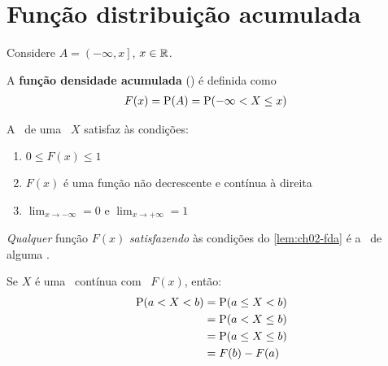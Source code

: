 \section[Distribuição acumulada]{Função distribuição acumulada}

Considere $A = \left(-\infty, x\right]$, $x \in \operatorname{\mathbb{R}}$.
\begin{definition}\label{def:ch02-fda}
    A \textbf{função densidade acumulada} (\fda) é definida como
    \begin{align}
        F(x) &= \operatorname{P}(A) = \operatorname{P}(-\infty < X \leq x)\label{eq:ch02-fda}
    \end{align}
\end{definition}

\begin{lemma}\label{lem:ch02-fda}
    A \fda\ de uma \va\ $X$ satisfaz às condições:
    \begin{enumerate}
        \item\label{it:ch02-fda-prop-amplitude}
            $0 \leq F(x) \leq 1$
        \item\label{it:ch02-fda-prop-cresc-cd}
            $F(x)$ é uma função não decrescente e contínua à direita
        \item\label{it:ch02-fda-prop-limites}
            $\lim_{x\to -\infty} = 0$ e $\lim_{x\to +\infty} = 1$
    \end{enumerate}
\end{lemma}

\textit{Qualquer} função $F(x)$ \textit{satisfazendo} às condições
do \cref{lem:ch02-fda} é a \fda\ de alguma \va.

Se $X$ é uma \va\ contínua com \fda\ $F(x)$, então:
\begin{align*}
    \operatorname{P}(a < X < b)
    &= \operatorname{P}(a \leq X < b) \\
    &= \operatorname{P}(a < X \leq b) \\
    &= \operatorname{P}(a \leq X \leq b) \\
    &= F(b) - F(a)
\end{align*}

